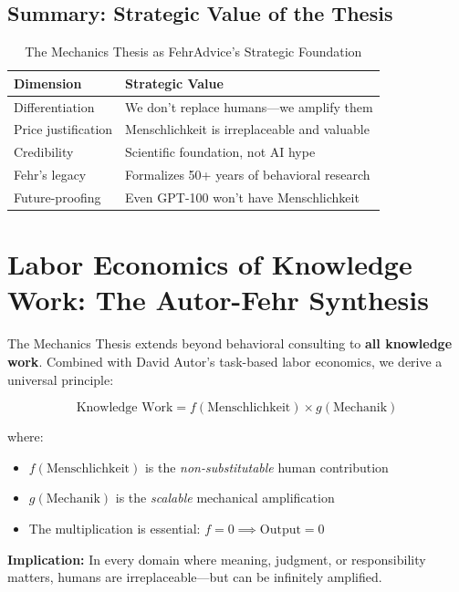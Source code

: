 \subsection{Summary: Strategic Value of the Thesis}

\begin{table}[htbp]
\centering
\caption{The Mechanics Thesis as FehrAdvice's Strategic Foundation}
\renewcommand{\arraystretch}{1.4}
\begin{tabular}{@{}p{3.5cm}p{8.5cm}@{}}
\toprule
\textbf{Dimension} & \textbf{Strategic Value} \\
\midrule
Differentiation & We don't replace humans---we amplify them \\
Price justification & Menschlichkeit is irreplaceable and valuable \\
Credibility & Scientific foundation, not AI hype \\
Fehr's legacy & Formalizes 50+ years of behavioral research \\
Future-proofing & Even GPT-100 won't have Menschlichkeit \\
\bottomrule
\end{tabular}
\end{table}


\section{Labor Economics of Knowledge Work: The Autor-Fehr Synthesis}
\label{sec:hi-autor-fehr}

\begin{tcolorbox}[colback=purple!10!white, colframe=purple!75!black,
    title=\textbf{Universal Principle: Knowledge Work Requires Humans}]

The Mechanics Thesis extends beyond behavioral consulting to \textbf{all knowledge work}. Combined with David Autor's task-based labor economics, we derive a universal principle:

\begin{equation}
\boxed{\text{Knowledge Work} = f(\text{Menschlichkeit}) \times g(\text{Mechanik})}
\label{eq:hi-universal}
\end{equation}

where:
\begin{itemize}[nosep]
    \item $f(\text{Menschlichkeit})$ is the \textit{non-substitutable} human contribution
    \item $g(\text{Mechanik})$ is the \textit{scalable} mechanical amplification
    \item The multiplication is essential: $f = 0 \implies \text{Output} = 0$
\end{itemize}

\textbf{Implication:} In every domain where meaning, judgment, or responsibility matters, humans are irreplaceable---but can be infinitely amplified.
\end{tcolorbox}

